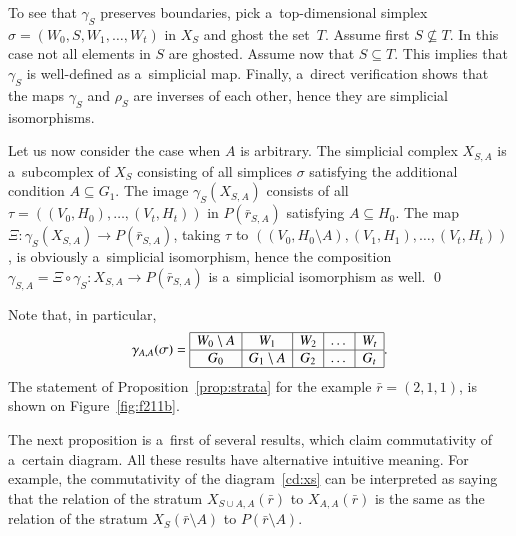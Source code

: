 \documentclass{amsart}[10pt]
\newcommand{\sm}{\setminus}
\newcommand{\tr}{{\bar r}}
\numberwithin{equation}{section}
\numberwithin{figure}{section}
\numberwithin{table}{section}
\begin{document}
To see that $\gamma_S$ preserves boundaries, pick a~top-dimensional
simplex $\sigma=(W_0,S,\allowbreak W_1,\dots,W_t)$ in $X_S$ and ghost the
set~$T$. Assume first $S\not\subseteq T$. In this case not all
elements in $S$ are ghosted. Assume now that $S\subseteq T$. This
implies that $\gamma_S$ is well-defined as a~simplicial map.  Finally,
a~direct verification shows that the maps $\gamma_S$ and $\rho_S$ are
inverses of each other, hence they are simplicial isomorphisms.

Let us now consider the case when $A$ is arbitrary. The simplicial
complex $X_{S,A}$ is a~subcomplex of $X_S$ consisting of all simplices
$\sigma$ satisfying the additional condition $A\subseteq G_1$. The
image $\gamma_S(X_{S,A})$ consists of all
$\tau=((V_0,H_0),\dots,(V_t,H_t))$ in $P(\bar r_{S,A})$ satisfying
$A\subseteq H_0$. The map $\Xi:\gamma_S(X_{S,A})\rightarrow P(\bar
r_{S,A})$, taking $\tau$ to $((V_0,H_0\setminus
A),(V_1,H_1),\dots,(V_t,H_t))$, is obviously a~simplicial isomorphism,
hence the composition
$\gamma_{S,A}=\Xi\circ\gamma_S:X_{S,A}\rightarrow P(\bar r_{S,A})$ is
a~simplicial isomorphism as well.  \qed

\vskip5pt

\nin Note that, in particular,
\[\gamma_{A,A}(\sigma)=\begin{array}{|c|c|c|c|c|}
\hline
W_0\sm A & W_1      & W_2 & \dots & W_t \\ \hline
G_0      & G_1\sm A & G_2 & \dots & G_t \\ 
\hline
\end{array}.\]
\nin The statement of Proposition~\ref{prop:strata} for the example
$\tr=(2,1,1)$, is shown on Figure~\ref{fig:f211b}.

The next proposition is a~first of several results, which claim
commutativity of a~certain diagram. All these results have alternative
intuitive meaning. For example, the commutativity of the
diagram~\eqref{cd:xs} can be interpreted as saying that the relation of
the stratum $X_{S\cup A,A}(\tr)$ to $X_{A,A}(\tr)$ is the same as the
relation of the stratum $X_S(\tr\sm A)$ to $P(\tr\sm A)$.
\end{document}
